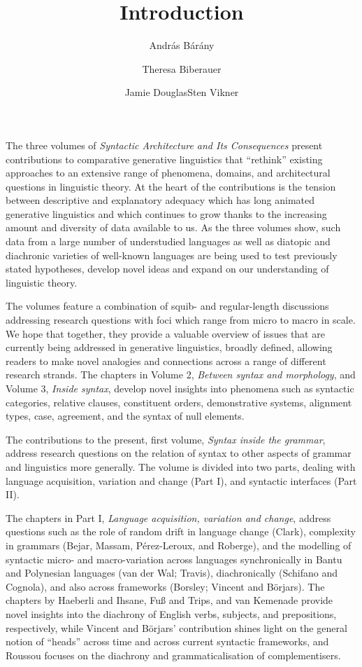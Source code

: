 \documentclass[output=paper]{langsci/langscibook}
\author{András Bárány\affiliation{Leiden University}\and Theresa Biberauer\affiliation{University of Cambridge, Stellenbosch University, University of the West Cape}\and Jamie Douglas\affiliation{University of Cambridge}\lastand Sten Vikner\affiliation{Aarhus University}}
\title{Introduction}
\begin{document}
\noindent The three volumes of \emph{Syntactic Architecture and Its
Consequences} present contributions to comparative generative linguistics that
\enquote{rethink} existing approaches to an extensive range of phenomena,
domains, and architectural questions in linguistic theory. At the heart of the
contributions is the tension between descriptive and explanatory adequacy which
has long animated generative linguistics and which continues to grow thanks to
the increasing amount and diversity of data available to us. As the three
volumes show, such data from a large number of understudied languages as well
as diatopic and diachronic varieties of well-known languages are being used to
test previously stated hypotheses, develop novel ideas and expand on our
understanding of linguistic theory.

The volumes feature a combination of squib- and regular-length discussions
addressing research questions with foci which range from micro to macro in
scale. We hope that together, they provide a valuable overview of issues that
are currently being addressed in generative linguistics, broadly defined,
allowing readers to make novel analogies and connections across a range of
different research strands. The chapters in Volume 2, \emph{Between syntax and
morphology}, and Volume 3, \emph{Inside syntax}, develop novel insights into
phenomena such as syntactic categories, relative clauses, constituent orders,
demonstrative systems, alignment types, case, agreement, and the syntax of null
elements.

The contributions to the present, first volume, \emph{Syntax inside the
grammar}, address research questions on the relation of syntax to other aspects
of grammar and linguistics more generally. The volume is divided into two
parts, dealing with language acquisition, variation and change (Part I), and
syntactic interfaces (Part II).

The chapters in Part I, \emph{Language acquisition, variation and change},
address questions such as the role of random drift in language change (Clark),
complexity in grammars (Bejar, Massam, Pérez-Leroux, and Roberge), and the
modelling of syntactic micro- and macro-variation across languages
synchronically in Bantu and Polynesian languages (van der Wal; Travis),
diachronically (Schifano and Cognola), and also across frameworks (Borsley;
Vincent and Börjars). The chapters by Haeberli and Ihsane, Fuß and Trips, and
van Kemenade provide novel insights into the diachrony of English verbs,
subjects, and prepositions, respectively, while Vincent and Börjars’
contribution shines light on the general notion of \enquote{heads} across time
and across current syntactic frameworks, and Roussou focuses on the diachrony
and grammaticalisation of complementisers.
\end{document}
